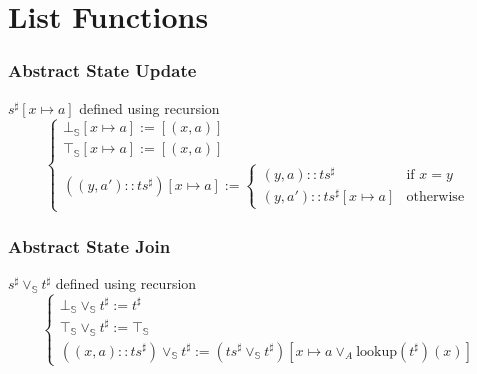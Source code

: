 \documentclass{beamer}
\begin{document}
\section{List Functions}



\begin{frame}
    \frametitle{Abstract State Update}
    \( s^{\sharp}[x \mapsto a] \) defined using recursion
    \[ 
        \begin{cases}
            \bot_\mathbb{S}[x \mapsto a] := [(x, a)] \\
            \top_\mathbb{S}[x \mapsto a] := [(x, a)] \\
            ((y, a') :: ts^{\sharp})[x \mapsto a] := \begin{cases}
                (y, a) :: {ts}^{\sharp} & \text{if } x = y \\
                (y, a') :: ts^{\sharp}[x \mapsto a] & \text{otherwise}
                \end{cases}
                                        \end{cases}
    \]
\end{frame}


\begin{frame}
    \frametitle{Abstract State Join}
    \( s^{\sharp} \vee_\mathbb{S} t^{\sharp}\) defined using recursion
    \[
    \begin{cases}
        \bot_\mathbb{S} \vee_\mathbb{S} t^{\sharp} := t^{\sharp} \\  
        \top_\mathbb{S} \vee_\mathbb{S} t^{\sharp} := \top_\mathbb{S} \\
        ((x, a) :: {ts}^{\sharp}) \vee_\mathbb{S} t^{\sharp} := ({ts}^{\sharp} \vee_\mathbb{S} t^{\sharp})[x \mapsto a \vee_A \text{lookup} (t^{\sharp}) (x)]
                                                    \end{cases} \]
\end{frame}
\end{document}
